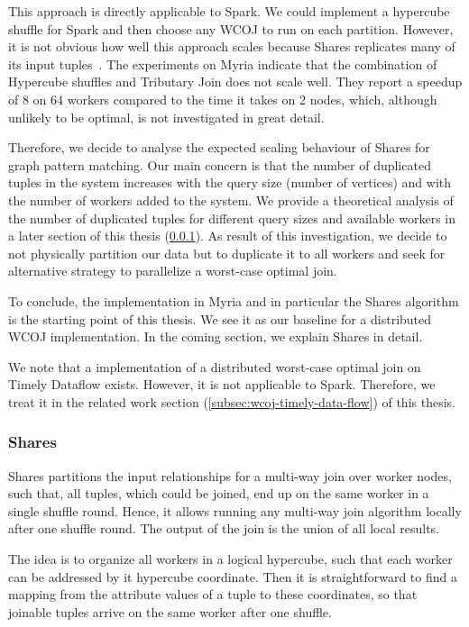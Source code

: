This approach is directly applicable to Spark.
We could implement a hypercube shuffle for Spark and then choose any \textsc{WCOJ} to run on each partition.
However, it is not obvious how well this approach scales because Shares replicates many of its input tuples~\cite{myria-detailed}.
The experiments on Myria indicate that the combination of Hypercube shuffles and Tributary Join does not scale well.
They report a speedup of 8 on 64 workers compared to the time it takes on 2 nodes, which, although unlikely to be optimal, is not
investigated in great detail.

Therefore, we decide to analyse the expected scaling behaviour of Shares for graph pattern matching.
Our main concern is that the number of duplicated tuples in the system increases with the query size (number of vertices) and
with the number of workers added to the system.
We provide a theoretical analysis of the number of duplicated tuples for different query sizes and available workers in a later section
of this thesis (\ref{subsubsec:shares}).
As result of this investigation, we decide to not physically partition our data but to duplicate it to all workers and seek for alternative
strategy to parallelize a worst-case optimal join.

To conclude, the implementation in Myria and in particular the Shares algorithm is the starting point of this thesis.
We see it as our baseline for a distributed \textsc{WCOJ} implementation.
In the coming section, we explain Shares in detail.

We note that a implementation of a distributed worst-case optimal join on Timely Dataflow exists.
However, it is not applicable to Spark.
Therefore, we treat it in the related work section (\ref{subsec:wcoj-timely-data-flow}) of this thesis.

\subsubsection{Shares}\label{subsubsec:shares}
Shares partitions the input relationships for a multi-way join over worker nodes, such that, all tuples, which could be joined,
end up on the same worker in a single shuffle round.
Hence, it allows running any multi-way join algorithm locally after one shuffle round.
The output of the join is the union of all local results.

The idea is to organize all workers in a logical hypercube, such that each worker can be addressed by it hypercube coordinate.
Then it is straightforward to find a mapping from the attribute values of a tuple to these coordinates, so that joinable tuples
arrive on the same worker after one shuffle.

